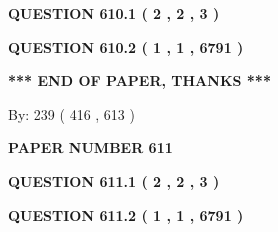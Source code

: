 \documentclass[12pt]{article}
\begin{document}
 
 
 
   
   
  
\vspace{0.2in}
  
{\textbf{\Large{QUESTION
610.1 
 ( 2 , 2 , 3 )
}}}
  
  
  
\vspace{0.2in}
  
{\textbf{\Large{QUESTION
610.2 
 ( 1 , 1 , 6791 )
}}}
  
  
   
   
 \vspace{0.2in}
 
   
   
   
   
\vspace{1.0in} 
{\textbf{\large{ *** END OF PAPER, THANKS *** }}} 
   
   
\hspace{1.0in} By: 
 239 ( 416 ,  613 )
   
   
   
   
\newpage 
\setcounter{page}{ 
   611001 } 
   
   
   
   
 {\textbf{ \Large{ PAPER NUMBER  611  }}}
   
   
\vspace{0.2in}
   
   
   
   
   
   
 \vspace{0.2in}
 
 
 
 
   
   
  
\vspace{0.2in}
  
{\textbf{\Large{QUESTION
611.1 
 ( 2 , 2 , 3 )
}}}
  
  
  
\vspace{0.2in}
  
{\textbf{\Large{QUESTION
611.2 
 ( 1 , 1 , 6791 )
}}}
  
  
   
   
 \vspace{0.2in}
 
   
   
   
   
\end{document}
